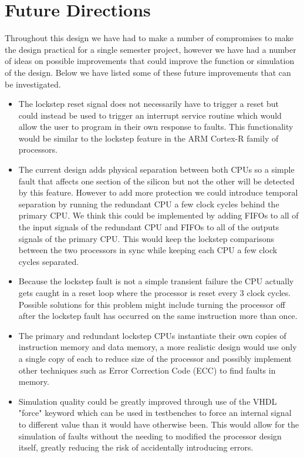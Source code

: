 \documentclass[12pt]{article}
\begin{document}
\section{Future Directions}
Throughout this design we have had to make a number of compromises to make the design practical for a single semester project, however we have had a number of ideas on possible improvements that could improve the function or simulation of the design. Below we have listed some of these future improvements that can be investigated.

\begin{itemize}
    \item The lockstep reset signal does not necessarily have to trigger a reset but could instead be used to trigger an interrupt service routine which would allow the user to program in their own response to faults. This functionality would be similar to the lockstep feature in the ARM Cortex-R family of processors.
    
    \item The current design adds physical separation between both CPUs so a simple fault that affects one section of the silicon but not the other will be detected by this feature. However to add more protection we could introduce temporal separation by running the redundant CPU a few clock cycles behind the primary CPU. We think this could be implemented by adding FIFOs to all of the input signals of the redundant CPU and FIFOs to all of the outputs signals of the primary CPU. This would keep the lockstep comparisons between the two processors in sync while keeping each CPU a few clock cycles separated.
    
    \item Because the lockstep fault is not a simple transient failure the CPU actually gets caught in a reset loop where the processor is reset every 3 clock cycles. Possible solutions for this problem might include turning the processor off after the lockstep fault has occurred on the same instruction more than once.
    
    \item The primary and redundant lockstep CPUs instantiate their own copies of instruction memory and data memory, a more realistic design would use only a single copy of each to reduce size of the processor and possibly implement other techniques such as Error Correction Code (ECC) to find faults in memory.
    
    \item Simulation quality could be greatly improved through use of the VHDL "force" keyword which can be used in testbenches to force an internal signal to different value than it would have otherwise been. This would allow for the simulation of faults without the needing to modified the processor design itself, greatly reducing the risk of accidentally introducing errors.
\end{itemize}
\end{document}
